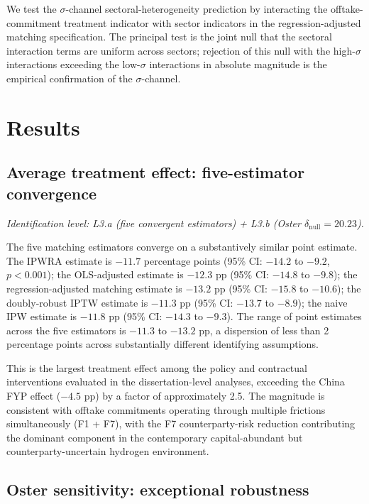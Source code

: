 \documentclass[12pt,a4paper]{article}
\theoremstyle{plain}
\theoremstyle{definition}
\begin{document}
We test the $\sigma$-channel sectoral-heterogeneity prediction by interacting the offtake-commitment treatment indicator with sector indicators in the regression-adjusted matching specification. The principal test is the joint null that the sectoral interaction terms are uniform across sectors; rejection of this null with the high-$\sigma$ interactions exceeding the low-$\sigma$ interactions in absolute magnitude is the empirical confirmation of the $\sigma$-channel.

\section{Results}
\label{sec:results}

\subsection{Average treatment effect: five-estimator convergence}
\label{sec:results-ate}

\noindent\emph{Identification level: L3.a (five convergent estimators) + L3.b (Oster $\delta_{\text{null}} = 20.23$).}

The five matching estimators converge on a substantively similar point estimate. The IPWRA estimate is $-11.7$ percentage points (95\% CI: $-14.2$ to $-9.2$, $p < 0.001$); the OLS-adjusted estimate is $-12.3$ pp (95\% CI: $-14.8$ to $-9.8$); the regression-adjusted matching estimate is $-13.2$ pp (95\% CI: $-15.8$ to $-10.6$); the doubly-robust IPTW estimate is $-11.3$ pp (95\% CI: $-13.7$ to $-8.9$); the naive IPW estimate is $-11.8$ pp (95\% CI: $-14.3$ to $-9.3$). The range of point estimates across the five estimators is $-11.3$ to $-13.2$ pp, a dispersion of less than 2 percentage points across substantially different identifying assumptions.

This is the largest treatment effect among the policy and contractual interventions evaluated in the dissertation-level analyses, exceeding the China FYP effect ($-4.5$ pp) by a factor of approximately 2.5. The magnitude is consistent with offtake commitments operating through multiple frictions simultaneously (F1 + F7), with the F7 counterparty-risk reduction contributing the dominant component in the contemporary capital-abundant but counterparty-uncertain hydrogen environment.

\subsection{Oster sensitivity: exceptional robustness}
\label{sec:results-oster}
\end{document}

